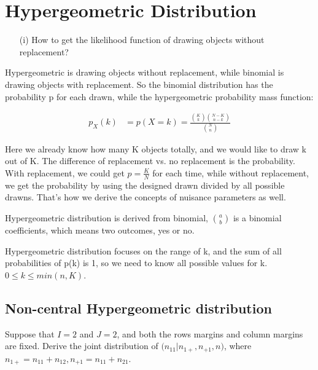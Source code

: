 \section{Hypergeometric Distribution}
\begin{itemize}
\item[(i)] How to get the likelihood function of drawing objects without replacement?

\end{itemize}

\begin{definition}
	Hypergeometric is drawing objects without replacement, while binomial is drawing objects with replacement. So the binomial distribution has the probability p for each drawn, while the hypergeometric probability mass function:
	
	\begin{align*}
		p_X(k) &= p(X=k) = \frac{{K \choose k} {N-K \choose n-k}}{ {N \choose n}}
	\end{align*}
	
\end{definition}
	
	Here we already know how many K objects totally, and we would like to draw k out of K. The difference of replacement vs. no replacement is the probability. With replacement, we could get $p= \frac{K}{N}$ for each time, while without replacement, we get the probability by using the designed drawn divided by all possible drawns. That's how we derive the concepts of nuisance parameters as well.
	
	Hypergeometric distribution is derived from binomial, $a \choose b$ is a binomial coefficients, which means two outcomes, yes or no. 

	Hypergeometric distribution focuses on the range of k, and the sum of all probabilities of p(k) is 1, so we need to know all possible values for k. $ 0 \leq k \leq min(n, K)$.
	

\subsection{Non-central Hypergeometric distribution}	
Suppose that $I=2$ and $J=2$, and both the rows margins and column margins are fixed. Derive the joint distribution of $\Big( n_{11} | n_{1+}, n_{+1}, n \Big)$, where $n_{1+} = n_{11} + n_{12}, n_{+1} = n_{11}+ n_{21}$.

